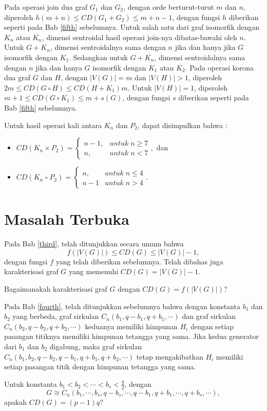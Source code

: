 Pada operasi join dua graf $G_1$ dan $G_2$, dengan orde berturut-turut $m$ dan $n$, diperoleh $h(m+n)\le CD(G_1+G_2)\le m+n-1$, dengan fungsi $h$ diberikan seperti pada Bab \cref{fifth} sebelumnya. Untuk salah satu dari graf isomorfik dengan $K_n$ atau $\overbar{K_n}$, dimensi sentroidal hasil operasi join-nya dibatas-bawahi oleh $n$. Untuk $G+K_n$, dimensi sentroidalnya sama dengan $n$ jika dan hanya jika $G$ isomorfik dengan $K_1$. Sedangkan untuk $G+\overbar{K_n}$, dimensi sentroidalnya sama dengan $n$ jika dan hanya $G$ isomorfik dengan $K_1$ atau $\overbar{K_2}$. Pada operasi korona dua graf $G$ dan $H$, dengan $|V(G)|=m$ dan $|V(H)|>1$, diperoleh $2m\le CD(G\circ H)\le CD(H+K_1)m$. Untuk $|V(H)|=1$, diperoleh $m+1\le CD(G\circ K_1)\le m+s(G)$, dengan fungsi $s$ diberikan seperti pada Bab \ref{fifth} sebelumnya.

Untuk hasil operasi kali antara $K_n$ dan $P_2$, dapat disimpulkan bahwa : 
\begin{itemize}
	\item $CD(K_n\times P_2)=\begin{cases}
	n-1, & untuk\;n\ge 7\\
	n, & untuk\;n<7
	\end{cases},$ dan
	\item $CD(K_n\;\square\; P_2)=\begin{cases}
	n, & untuk\;n\le 4\\
	n-1 & untuk \;n>4
	\end{cases}$.
\end{itemize}

\section{Masalah Terbuka}
Pada Bab \ref{third}, telah ditunjukkan secara umum bahwa \[f(|V(G)|)\le CD(G)\le |V(G)|-1,\] dengan fungsi $f$ yang telah diberikan sebelumnya. Telah dibahas juga karakterisasi graf $G$ yang memenuhi $CD(G)=|V(G)|-1$.
\begin{masalah}
	Bagaimanakah karakterisasi graf $G$ dengan $CD(G)=f(|V(G)|)$?
\end{masalah}

Pada Bab \ref{fourth}, telah ditunjukkan sebelumnya bahwa dengan konstanta $b_1$ dan $b_2$ yang berbeda, graf sirkulan
$C_n(b_1,q-b_1,q+b_1,\cdots)$ dan graf sirkulan $C_n(b_2,q-b_2,q+b_2,\cdots)$ keduanya memiliki himpunan $H_i$ dengan setiap pasangan titiknya memiliki himpunan tetangga yang sama. Jika kedua generator dari $b_1$ dan $b_2$ digabung, maka graf sirkulan $C_n(b_1,b_2,q-b_2,q-b_1,q+b_1,q+b_2,\cdots)$ tetap mengakibatkan $H_i$ memiliki setiap pasangan titik dengan himpunan tetangga yang sama.
\begin{masalah}
	Untuk konstanta $b_1<b_2<\cdots<b_s<\frac{q}{2}$, dengan \[G\cong C_n(b_1,\cdots,b_s,q-b_s,\cdots,q-b_1,q+b_1,\cdots,q+b_s,\cdots),\]
	apakah $CD(G)=(p-1)q$?
\end{masalah}

